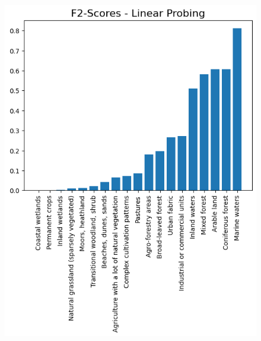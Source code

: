 \begin{figure}[h]
  \centering
  \begin{minipage}[b]{0.48\columnwidth}
    \centering
    \includegraphics[width=\columnwidth]{images/Linear Probing - f2 scores.png}
  \end{minipage}
  \begin{minipage}[b]{0.48\columnwidth}
    \centering

\end{minipage}
\end{figure}
